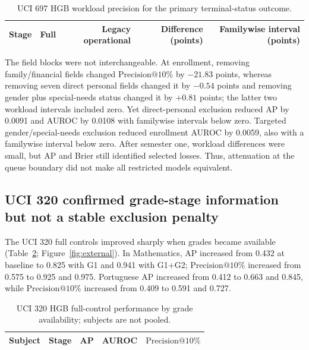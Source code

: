 \documentclass[11pt]{article}
\makeatletter
\newcommand{\Pten}{\ensuremath{\mathrm{Precision}@10\%}}
\makeatother
\begin{document}
\begin{table}[htbp]
\centering
\caption{UCI 697 HGB workload precision for the primary terminal-status outcome.}
\label{tab:uci697}
\small
\begin{tabular}{lrrrr}
\toprule
Stage & Full & Legacy operational & Difference (points) & Familywise interval (points) \\
\midrule

\end{tabular}
\end{table}

The field blocks were not interchangeable. At enrollment, removing family/financial fields changed \Pten{} by $-21.83$ points, whereas removing seven direct personal fields changed it by $-0.54$ points and removing gender plus special-needs status changed it by $+0.81$ points; the latter two workload intervals included zero. Yet direct-personal exclusion reduced AP by 0.0091 and AUROC by 0.0108 with familywise intervals below zero. Targeted gender/special-needs exclusion reduced enrollment AUROC by 0.0059, also with a familywise interval below zero. After semester one, workload differences were small, but AP and Brier still identified selected losses. Thus, attenuation at the queue boundary did not make all restricted models equivalent.

\subsection{UCI 320 confirmed grade-stage information but not a stable exclusion penalty}

The UCI 320 full controls improved sharply when grades became available (Table~\ref{tab:uci320}; Figure~\ref{fig:external}). In Mathematics, AP increased from 0.432 at baseline to 0.825 with G1 and 0.941 with G1+G2; \Pten{} increased from 0.575 to 0.925 and 0.975. Portuguese AP increased from 0.412 to 0.663 and 0.845, while \Pten{} increased from 0.409 to 0.591 and 0.727.

\begin{table}[htbp]
\centering
\caption{UCI 320 HGB full-control performance by grade availability; subjects are not pooled.}
\label{tab:uci320}
\small
\begin{tabular}{llrrr}
\toprule
Subject & Stage & AP & AUROC & \Pten \\
\midrule

\end{tabular}
\end{table}
\end{document}
